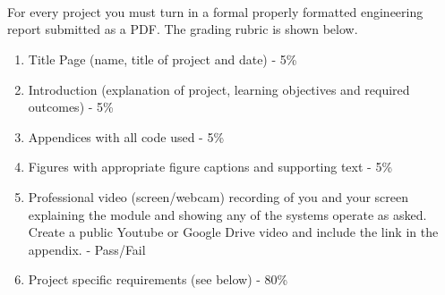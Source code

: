 \ \\
\ \\
\ \\
\noindent For every project you must turn in a formal properly formatted engineering report submitted as a PDF. The grading rubric is shown below.

\begin{enumerate}[itemsep=-5pt]
\item Title Page (name, title of project and date) - 5\%
\item Introduction (explanation of project, learning objectives and required outcomes) - 5\%
\item Appendices with all code used - 5\%
\item Figures with appropriate figure captions and supporting text - 5\%
\item Professional video (screen/webcam) recording of you and your screen explaining the module and showing any of the systems operate as asked. Create a public Youtube or Google Drive video and include the link in the appendix. - Pass/Fail
\item Project specific requirements (see below) - 80\%
\end{enumerate}

